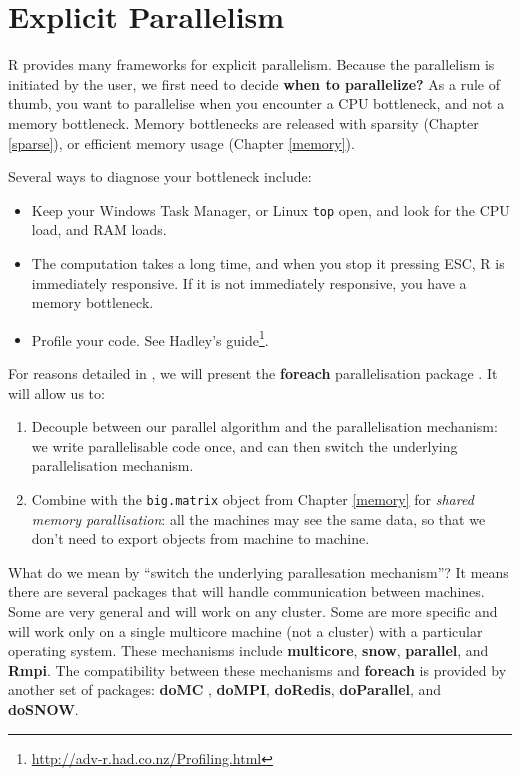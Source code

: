 \documentclass[]{book}
\providecommand{\tightlist}{%
  \setlength{\itemsep}{0pt}\setlength{\parskip}{0pt}}
\renewcommand{\href}[2]{#2\footnote{\url{#1}}}
\theoremstyle{definition}
\theoremstyle{definition}
\theoremstyle{definition}
\theoremstyle{remark}
\begin{document}
\hypertarget{explicit-parallelism}{%
\section{Explicit Parallelism}\label{explicit-parallelism}}

R provides many frameworks for explicit parallelism.
Because the parallelism is initiated by the user, we first need to decide \textbf{when to parallelize?}
As a rule of thumb, you want to parallelise when you encounter a CPU bottleneck, and not a memory bottleneck.
Memory bottlenecks are released with sparsity (Chapter \ref{sparse}), or efficient memory usage (Chapter \ref{memory}).

Several ways to diagnose your bottleneck include:

\begin{itemize}
\tightlist
\item
  Keep your Windows Task Manager, or Linux \texttt{top} open, and look for the CPU load, and RAM loads.
\item
  The computation takes a long time, and when you stop it pressing ESC, R is immediately responsive. If it is not immediately responsive, you have a memory bottleneck.
\item
  Profile your code. See Hadley's \href{http://adv-r.had.co.nz/Profiling.html}{guide}.
\end{itemize}

For reasons detailed in \citet{kane2013scalable}, we will present the \textbf{foreach} parallelisation package \citep{foreach}.
It will allow us to:

\begin{enumerate}
\def\labelenumi{\arabic{enumi}.}
\item
  Decouple between our parallel algorithm and the parallelisation mechanism: we write parallelisable code once, and can then switch the underlying parallelisation mechanism.
\item
  Combine with the \texttt{big.matrix} object from Chapter \ref{memory} for \emph{shared memory parallisation}: all the machines may see the same data, so that we don't need to export objects from machine to machine.
\end{enumerate}

What do we mean by ``switch the underlying parallesation mechanism''?
It means there are several packages that will handle communication between machines.
Some are very general and will work on any cluster.
Some are more specific and will work only on a single multicore machine (not a cluster) with a particular operating system.
These mechanisms include \textbf{multicore}, \textbf{snow}, \textbf{parallel}, and \textbf{Rmpi}.
The compatibility between these mechanisms and \textbf{foreach} is provided by another set of packages:
\textbf{doMC} , \textbf{doMPI}, \textbf{doRedis}, \textbf{doParallel}, and \textbf{doSNOW}.
\end{document}
